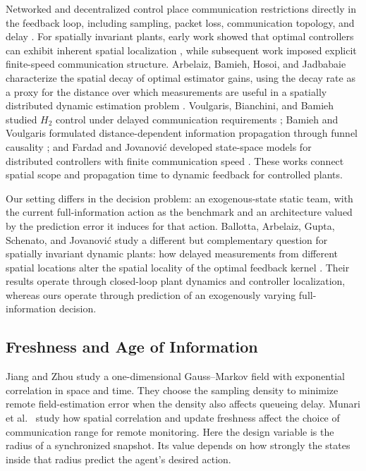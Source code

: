 \documentclass[11pt]{article}
\begin{document}
Networked and decentralized control place communication restrictions directly
in the feedback loop, including sampling, packet loss, communication topology,
and delay \cite{hespanha2007survey}. For spatially invariant plants, early work
showed that optimal controllers can exhibit inherent spatial localization
\cite{bamieh2002spatial}, while subsequent work imposed explicit finite-speed
communication structure. Arbelaiz, Bamieh, Hosoi, and Jadbabaie characterize
the spatial decay of optimal estimator gains, using the decay rate as a proxy
for the distance over which measurements are useful in a spatially distributed
dynamic estimation problem \cite{arbelaiz2025estimation}. Voulgaris, Bianchini, and Bamieh studied $H_2$ control
under delayed communication requirements \cite{voulgaris2003optimal}; Bamieh
and Voulgaris formulated distance-dependent information propagation through
funnel causality \cite{bamieh2005convex}; and Fardad and Jovanovi\'c developed
state-space models for distributed controllers with finite communication speed
\cite{fardad2011finite}. These works connect spatial scope and propagation time to dynamic feedback
for controlled plants.

Our setting differs in the decision problem: an exogenous-state static team,
with the current full-information action as the benchmark and an architecture
valued by the prediction error it induces for that action. 
Ballotta, Arbelaiz, Gupta, Schenato, and Jovanovi\'c study a different but
complementary question for spatially invariant dynamic plants: how delayed
measurements from different spatial locations alter the spatial locality of the
optimal feedback kernel \cite{ballotta2026role}. Their results operate through
closed-loop plant dynamics and controller localization, whereas ours operate
through prediction of an exogenously varying full-information decision.

\subsection{Freshness and Age of Information}
\label{subsec:related_aoi}

Jiang and Zhou \cite{jiang2019status} study a one-dimensional
Gauss--Markov field with exponential correlation in space and time.
They choose the sampling density to minimize remote field-estimation
error when the density also affects queueing delay.
Munari et al.~\cite{munari2025spatiotemporal} study how spatial
correlation and update freshness affect the choice of communication
range for remote monitoring. Here the design variable is the radius
of a synchronized snapshot. Its value depends on how strongly the
states inside that radius predict the agent's desired action.
\end{document}
